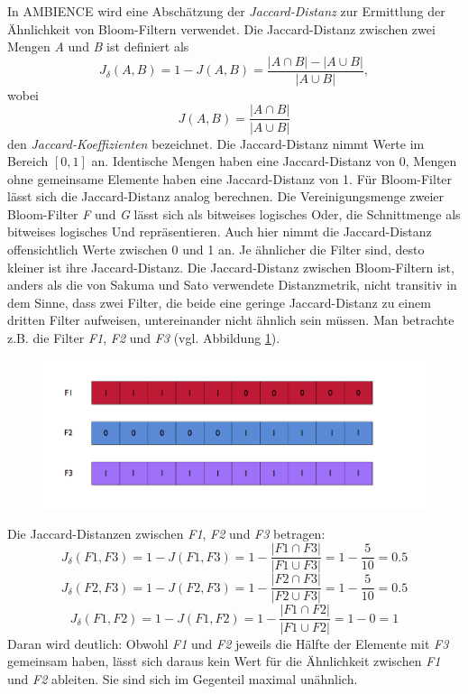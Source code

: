In AMBIENCE wird eine Abschätzung der \textit{Jaccard-Distanz} zur Ermittlung der Ähnlichkeit von Bloom-Filtern verwendet. Die Jaccard-Distanz zwischen zwei Mengen \textit{A} und \textit{B} ist definiert als 
\[J_{\delta}(A,B) = 1 - J(A,B) = \frac{|A\cap B| - |A\cup B|}{|A\cup B|}, \]
wobei 
\[J(A,B) = \frac{|A\cap B|}{|A\cup B|}\] den \textit{Jaccard-Koeffizienten} bezeichnet. Die Jaccard-Distanz nimmt Werte im Bereich $\left[0,1\right]$ an. Identische Mengen haben eine Jaccard-Distanz von 0, Mengen ohne gemeinsame Elemente haben eine Jaccard-Distanz von 1. 
Für Bloom-Filter lässt sich die Jaccard-Distanz analog berechnen. Die Vereinigungsmenge zweier Bloom-Filter \textit{F} und \textit{G} lässt sich als bitweises logisches Oder, die Schnittmenge als bitweises logisches Und repräsentieren. Auch hier nimmt die Jaccard-Distanz offensichtlich Werte zwischen 0 und 1 an. Je ähnlicher die Filter sind, desto kleiner ist ihre Jaccard-Distanz. 
Die Jaccard-Distanz zwischen Bloom-Filtern ist, anders als die von Sakuma und Sato verwendete Distanzmetrik, nicht transitiv in dem Sinne, dass zwei Filter, die beide eine geringe Jaccard-Distanz zu einem dritten Filter aufweisen, untereinander nicht ähnlich sein müssen. Man betrachte z.B. die Filter \textit{F1}, \textit{F2} und \textit{F3} (vgl. Abbildung \ref{fig:pic1}).  
\begin{figure}
  \centering
  \label{fig:pic1}
  \includegraphics[width=1.0\textwidth]{pictures/filters.png}
\end{figure}
\noindent
Die Jaccard-Distanzen zwischen \textit{F1}, \textit{F2} und \textit{F3} betragen: 
\[J_{\delta}(F1,F3) = 1 - J(F1,F3) = 1 - \frac{|F1\cap F3|}{|F1\cup F3|} = 1 - \frac{5}{10} = 0.5\]
\[J_{\delta}(F2,F3) = 1 - J(F2,F3) = 1 - \frac{|F2\cap F3|}{|F2\cup F3|} = 1 - \frac{5}{10} = 0.5\]
\[J_{\delta}(F1,F2) = 1 - J(F1,F2) = 1 - \frac{|F1\cap F2|}{|F1\cup F2|} = 1 - 0 = 1\]
Daran wird deutlich: Obwohl \textit{F1} und \textit{F2} jeweils die Hälfte der Elemente mit \textit{F3} gemeinsam haben, lässt sich daraus kein Wert für die Ähnlichkeit zwischen \textit{F1} und \textit{F2} ableiten. Sie sind sich im Gegenteil maximal unähnlich. 
